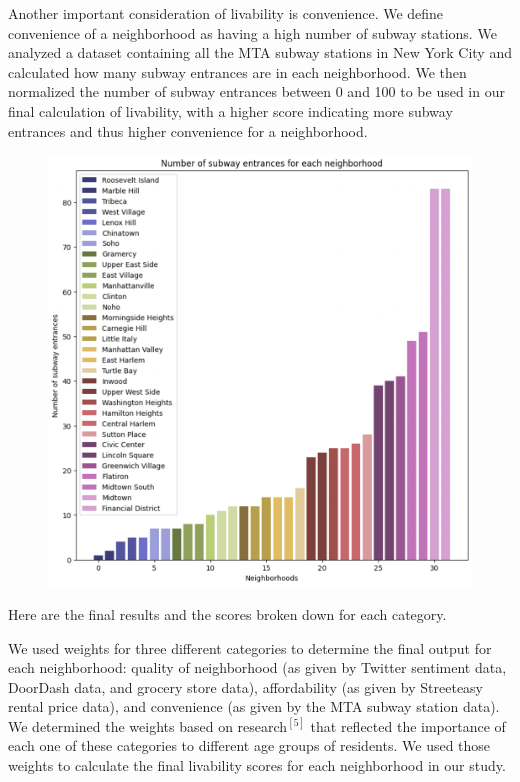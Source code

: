 \documentclass{article}
\begin{document}
\newpage

Another important consideration of livability is convenience.  We define convenience of a neighborhood as having a high number of subway stations.  We analyzed a dataset containing all the MTA subway stations in New York City and calculated how many subway entrances are in each neighborhood.  We then normalized the number of subway entrances between 0 and 100 to be used in our final calculation of livability, with a higher score indicating more subway entrances and thus higher convenience for a neighborhood. 

\begin{figure}[h]
\centering
\includegraphics[scale=0.50]{mta.JPG}
\end{figure}

Here are the final results and the scores broken down for each category.  

We used weights for three different categories to determine the final output for each neighborhood: quality of neighborhood (as given by Twitter sentiment data, DoorDash data, and grocery store data), affordability (as given by Streeteasy rental price data), and convenience (as given by the MTA subway station data).  We determined the weights based on research$^{[5]}$ that reflected the importance of each one of these categories to different age groups of residents. We used those weights to calculate the final livability scores for each neighborhood in our study. 
\end{document}
